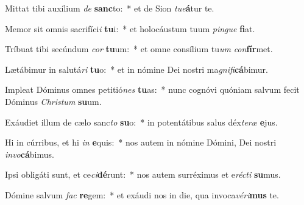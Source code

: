 \item Mittat tibi auxílium \textit{de} \textbf{sanc}to:~* et de Sion \textit{tu}\textit{e}\textbf{á}tur te.
\item Memor sit omnis sacrifíci\textit{i} \textbf{tu}i:~* et holocáustum tuum \textit{pin}\textit{gue} \textbf{fi}at.
\item Tríbuat tibi secúndum \textit{cor} \textbf{tu}um:~* et omne consílium tu\textit{um} \textit{con}\textbf{fír}met.
\item Lætábimur in salutá\textit{ri} \textbf{tu}o:~* et in nómine Dei nostri ma\textit{gni}\textit{fi}\textbf{cá}bimur.
\item Impleat Dóminus omnes petitió\textit{nes} \textbf{tu}as:~* nunc cognóvi quóniam salvum fecit Dóminus \textit{Chris}\textit{tum} \textbf{su}um.
\item Exáudiet illum de cælo sanc\textit{to} \textbf{su}o:~* in potentátibus salus déx\textit{te}\textit{ræ} \textbf{e}jus.
\item Hi in cúrribus, et hi \textit{in} \textbf{e}quis:~* nos autem in nómine Dómini, Dei nostri \textit{in}\textit{vo}\textbf{cá}bimus.
\item Ipsi obligáti sunt, et ce\textit{ci}\textbf{dé}runt:~* nos autem surréximus et e\textit{réc}\textit{ti} \textbf{su}mus.
\item Dómine salvum \textit{fac} \textbf{re}gem:~* et exáudi nos in die, qua invoca\textit{vé}\textit{ri}\textbf{mus} te.
